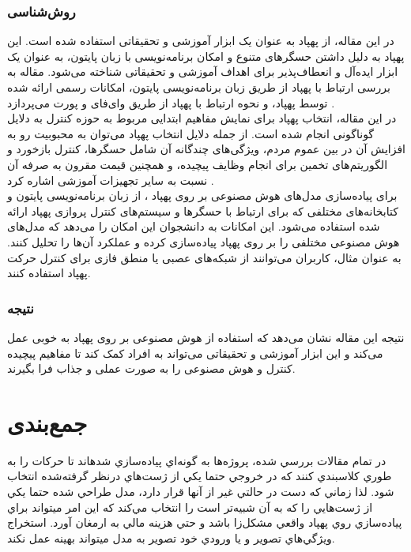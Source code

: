 \subsubsection{روش‌شناسی}
در این مقاله، از پهپاد  به عنوان یک ابزار آموزشی و تحقیقاتی استفاده شده است. این پهپاد به دلیل داشتن حسگرهای متنوع و امکان برنامه‌نویسی با زبان پایتون، به عنوان یک 
ابزار ایده‌آل و انعطاف‌پذیر برای اهداف آموزشی و تحقیقاتی شناخته می‌شود. مقاله به بررسی ارتباط با پهپاد  از طریق زبان برنامه‌نویسی پایتون، امکانات 
 رسمی ارائه شده توسط پهپاد، و نحوه ارتباط با پهپاد از طریق وای‌فای و پورت  می‌پردازد .
\\
در این مقاله، انتخاب پهپاد  برای نمایش مفاهیم ابتدایی مربوط به حوزه کنترل به دلایل گوناگونی انجام شده است. از جمله دلایل انتخاب پهپاد می‌توان به محبوبیت رو به افزایش آن در بین عموم مردم،
ویژگی‌های چندگانه آن شامل حسگرها، کنترل بازخورد و الگوریتم‌های تخمین برای انجام وظایف پیچیده، و همچنین قیمت مقرون به صرفه آن نسبت به سایر تجهیزات آموزشی اشاره کرد .
\\
برای پیاده‌سازی مدل‌های هوش مصنوعی بر روی پهپاد ، از زبان برنامه‌نویسی پایتون و کتابخانه‌های مختلفی که برای ارتباط با حسگرها و سیستم‌های کنترل پروازی پهپاد ارائه شده استفاده می‌شود. این امکانات به دانشجوان این 
امکان را می‌دهد که مدل‌های هوش مصنوعی مختلفی را بر روی پهپاد پیاده‌سازی کرده و عملکرد آن‌ها را تحلیل کنند. به عنوان مثال، کاربران می‌توانند از شبکه‌های عصبی یا منطق فازی برای کنترل حرکت پهپاد استفاده کنند.

\subsubsection{نتیجه}
نتیجه این مقاله نشان می‌دهد که استفاده از هوش مصنوعی بر روی پهپاد  به خوبی عمل می‌کند و این ابزار آموزشی و تحقیقاتی می‌تواند به افراد کمک کند تا مفاهیم پیچیده کنترل و هوش مصنوعی را به صورت عملی و جذاب فرا بگیرند. 
\cite{ghazi2023use}

\section{جمع‌بندی}
در تمام مقالات بررسي شده، پروژه‌ها به گونه‌اي پياده‌سازي شدهاند تا حركات را به طوري كلاسبندي كنند كه در خروجي حتما يكي از ژست‌هاي درنظر گرفته‌شده انتخاب شود. لذا زماني كه دست در حالتي غير از آنها قرار دارد، مدل طراحي شده 
حتما يكي از ژست‌هايي را كه به آن شبيه‌تر است را انتخاب مي‌كند كه اين امر ميتواند براي پياده‌سازي روي پهپاد واقعي مشكل‌زا باشد و حتي هزينه مالي به ارمغان آورد. استخراج ويژگي‌هاي تصوير و يا ورودي خود تصوير به مدل ميتواند بهينه عمل نكند.